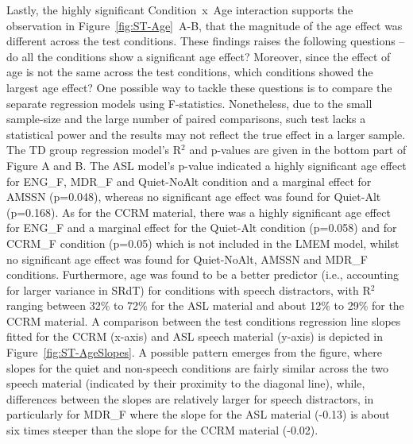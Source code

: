 \documentclass[a4paper, twoside]{templates/ociamthesis}
\begin{document}
Lastly, the highly significant Condition~x~Age interaction supports the observation in Figure~\ref{fig:ST-Age}~A-B, that the magnitude of the age effect was different across the test conditions. These findings raises the following questions -- do all the conditions show a significant age effect? Moreover, since the effect of age is not the same across the test conditions, which conditions showed the largest age effect? One possible way to tackle these questions is to compare the separate regression models using F-statistics. Nonetheless, due to the small sample-size and the large number of paired comparisons, such test lacks a statistical power and the results may not reflect the true effect in a larger sample. The TD group regression model's R\(^{2}\) and p-values are given in the bottom part of Figure A and B. The ASL model's p-value indicated a highly significant age effect for ENG\_F, MDR\_F and Quiet-NoAlt condition and a marginal effect for AMSSN (p=0.048), whereas no significant age effect was found for Quiet-Alt (p=0.168). As for the CCRM material, there was a highly significant age effect for ENG\_F and a marginal effect for the Quiet-Alt condition (p=0.058) and for CCRM\_F condition (p=0.05) which is not included in the LMEM model, whilst no significant age effect was found for Quiet-NoAlt, AMSSN and MDR\_F conditions. Furthermore, age was found to be a better predictor (i.e., accounting for larger variance in SRdT) for conditions with speech distractors, with R\(^{2}\) ranging between 32\% to 72\% for the ASL material and about 12\% to 29\% for the CCRM material. A comparison between the test conditions regression line slopes fitted for the CCRM (x-axis) and ASL speech material (y-axis) is depicted in Figure~\ref{fig:ST-AgeSlopes}. A possible pattern emerges from the figure, where slopes for the quiet and non-speech conditions are fairly similar across the two speech material (indicated by their proximity to the diagonal line), while, differences between the slopes are relatively larger for speech distractors, in particularly for MDR\_F where the slope for the ASL material (-0.13) is about six times steeper than the slope for the CCRM material (-0.02).
\end{document}
